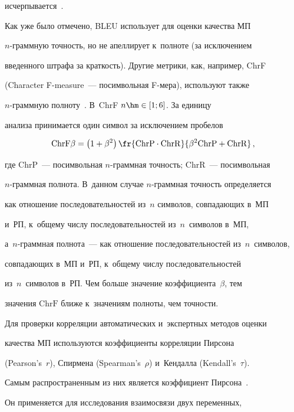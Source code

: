 исчерпывается~\cite{4-r, 22-r}. 

  

  Как уже было отмечено, BLEU использует для оценки качества МП  

$n$-грам\-мную точность, но не апеллирует к~полноте (за исключением 

введенного штрафа за краткость). Другие метрики, как, например, ChrF 

(Character F-measure~--- посимвольная F-ме\-ра), используют также 

$n$-граммную полноту~\cite{24-r, 25-r}. В~ChrF $n\hm\in [1;6]$. За единицу 

анализа принимается один символ за исключением пробелов



\noindent

  $$

\mathrm{ChrF}\beta=\left( 1+\beta^2\right) \fr{\mathrm{ChrP}\cdot \mathrm{ChrR}}

{\beta^2  \mathrm{ChrP}+\mathrm{ChrR}}\,,

  $$

где $\mathrm{ChrP}$~--- посимвольная $n$-граммная точность; $\mathrm{ChrR}$~--- посимвольная 

\mbox{$n$-грам}\-мная полнота.  В~данном случае $n$-грам\-мная точ\-ность определяется 

как отношение последовательностей из~$n$ символов, совпадающих в~МП 

и~РП, к~общему чис\-лу последовательностей из~$n$~символов в~МП,  

а~$n$-грам\-мная полнота~--- как отношение последовательностей из~$n$~символов, 

совпадающих в~МП и~РП, к~общему числу последовательностей 

из~$n$~символов в~РП.  Чем больше значение коэффициента~$\beta$, тем 

значения $\mathrm{ChrF}$ ближе к~значениям полноты, чем точности. 



  Для проверки корреляции автоматических и~экспертных методов оценки 

качества МП используются коэффициенты корреляции Пирсона 

(Pearson's~$r$), Спирмена (Spearman's~$\rho$) и~Кендалла (Kendall's~$\tau$). 

Самым распространенным из них является коэффициент Пирсона~\cite{26-r}. 

Он применяется для исследования взаимосвязи двух переменных, 

